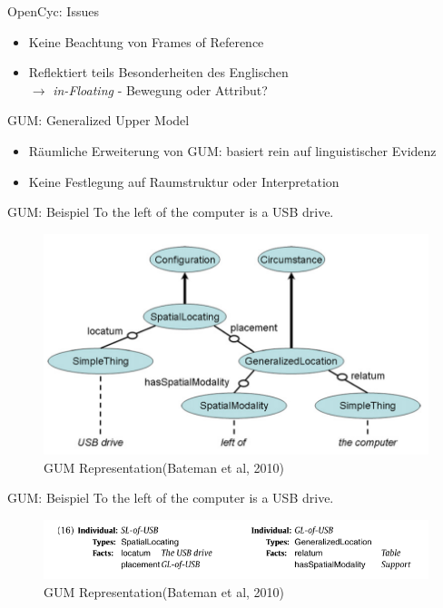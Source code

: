 \documentclass[12pt,a4paper]{beamer}
\begin{document}
\begin{frame}{OpenCyc: Issues}
\begin{itemize}
\item Keine Beachtung von Frames of Reference
\item Reflektiert teils Besonderheiten des Englischen\\
$\to$ \textit{in-Floating} - Bewegung oder Attribut?
\end{itemize}
\end{frame}



\begin{frame}{GUM: Generalized Upper Model}
\begin{itemize}
\item Räumliche Erweiterung von GUM: basiert rein auf linguistischer Evidenz
\item Keine Festlegung auf Raumstruktur oder Interpretation
\end{itemize}
\end{frame}


\begin{frame}{GUM: Beispiel}
To the left of the computer is a USB drive.

\begin{figure}
\includegraphics[scale=0.45]{img/2010_fig3.png}
\caption{GUM Representation(Bateman et al, 2010)}
\end{figure}
\end{frame}


\begin{frame}{GUM: Beispiel}
To the left of the computer is a USB drive.

\begin{figure}
\includegraphics[scale=0.45]{img/2010_gl_of_usb.png}
\caption{GUM Representation(Bateman et al, 2010)}
\end{figure}
\end{frame}
\end{document}
